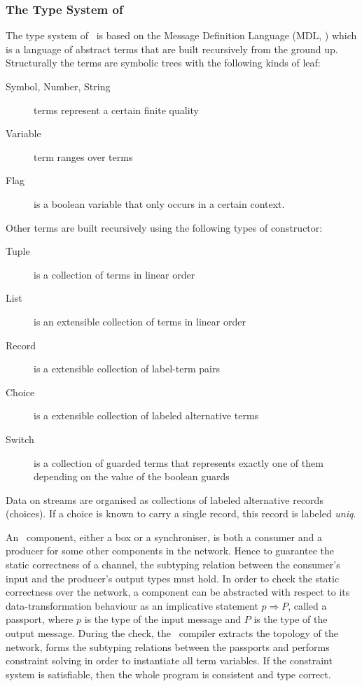     \subsubsection{The Type System of \ak\ }
The type system of \ak\ is based on the Message Definition Language (MDL, \cite{astrakahn}) which is a language of abstract terms that are built recursively from the ground up. Structurally the terms are symbolic trees with the following kinds of leaf:
\begin{description}
\item[Symbol, Number, String] terms represent a certain finite quality
\item[Variable] term ranges over terms
\item[Flag] is a boolean variable that only occurs in a certain context.
\end{description}
Other terms are built recursively using the following types of constructor:
\begin{description}
\item[Tuple] is a collection of terms in linear order
\item[List] is an extensible collection of terms in linear order
\item[Record] is a extensible collection of label-term pairs
\item[Choice] is a extensible collection of labeled alternative terms
\item[Switch] is a collection of guarded terms that represents exactly one of them depending on the value of the boolean guards
\end{description}

Data on streams are organised as collections of labeled alternative records (choices). If a choice is known to carry a single record, this record is labeled \emph{uniq}.

An \ak\ component, either a box or a synchroniser, is both a consumer and a producer for some other components in the network. Hence to guarantee the static correctness of a channel, the subtyping relation between the consumer's input and the producer's output types must hold. In order to check the static correctness over the network, a component can be abstracted with respect to its data-transformation behaviour as an implicative statement $p \Rightarrow P$, called a passport, where $p$ is the type of the input message and $P$ is the type of the output message. During the check, the \ak\ compiler extracts the topology of the network, forms the subtyping relations between the passports and performs constraint solving in order to instantiate all term variables. If the constraint system is satisfiable, then the whole program is consistent and type correct.


